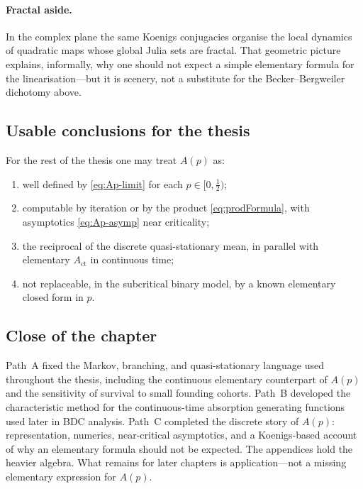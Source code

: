 \paragraph{Fractal aside.}
In the complex plane the same Koenigs conjugacies organise the local dynamics of quadratic maps whose global Julia sets are fractal. That geometric picture explains, informally, why one should not expect a simple elementary formula for the linearisation---but it is scenery, not a substitute for the Becker--Bergweiler dichotomy above.

\subsection{Usable conclusions for the thesis}
\label{sec:ap-takeaway}

For the rest of the thesis one may treat $A(p)$ as:
\begin{enumerate}[leftmargin=*]
\item well defined by \eqref{eq:Ap-limit} for each $p\in\bigl[0,\tfrac12\bigr)$;
\item computable by iteration or by the product \eqref{eq:prodFormula}, with asymptotics \eqref{eq:Ap-asymp} near criticality;
\item the reciprocal of the discrete quasi-stationary mean, in parallel with elementary $A_{\mathrm{ct}}$ in continuous time;
\item not replaceable, in the subcritical binary model, by a known elementary closed form in $p$.
\end{enumerate}

\subsection*{Close of the chapter}

Path~A fixed the Markov, branching, and quasi-stationary language used throughout the thesis, including the continuous elementary counterpart of $A(p)$ and the sensitivity of survival to small founding cohorts. Path~B developed the characteristic method for the continuous-time absorption generating functions used later in BDC analysis. Path~C completed the discrete story of $A(p)$: representation, numerics, near-critical asymptotics, and a Koenigs-based account of why an elementary formula should not be expected. The appendices hold the heavier algebra. What remains for later chapters is application---not a missing elementary expression for $A(p)$.
